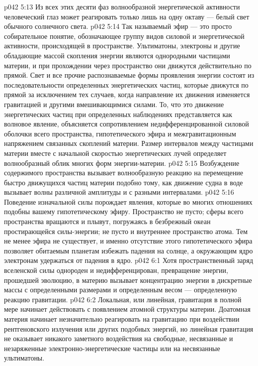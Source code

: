 \vs p042 5:13 \pc Из всех этих десяти фаз волнообразной энергетической активности человеческий глаз может реагировать только лишь на одну октаву --- белый свет обычного солнечного света.
\vs p042 5:14 \pc Так называемый эфир --- это просто собирательное понятие, обозначающее группу видов силовой и энергетической активности, происходящей в пространстве. Ультиматоны, электроны и другие обладающие массой скопления энергии являются однородными частицами материи, и при прохождении через пространство они движутся действительно по прямой. Свет и все прочие распознаваемые формы проявления энергии состоят из последовательности определенных энергетических частиц, которые движутся по прямой за исключением тех случаев, когда направление их движения изменяется гравитацией и другими вмешивающимися силами. То, что это движение энергетических частиц при определенных наблюдениях представляется как волновое явление, объясняется сопротивлением недифференцированной силовой оболочки всего пространства, гипотетического эфира и межгравитационным напряжением связанных скоплений материи. Размер интервалов между частицами материи вместе с начальной скоростью энергетических лучей определяет волнообразный облик многих форм энергии\hyp{}материи.
\vs p042 5:15 Возбуждение содержимого пространства вызывает волнообразную реакцию на перемещение быстро движущихся частиц материи подобно тому, как движение судна в воде вызывает волны различной амплитуды и с разными интервалами.
\vs p042 5:16 Поведение изначальной силы порождает явления, которые во многих отношениях подобны вашему гипотетическому эфиру. Пространство не пусто; сферы всего пространства вращаются и плывут, погружаясь в безбрежный океан простирающейся силы\hyp{}энергии; не пусто и внутреннее пространство атома. Тем не менее эфира не существует, и именно отсутствие этого гипотетического эфира позволяет обитаемым планетам избежать падения на солнце, а окружающим ядро электронам удержаться от падения в ядро.
\vs p042 6:1 Хотя пространственный заряд вселенской силы однороден и недифференцирован, превращение энергии, прошедшей эволюцию, в материю вызывает концентрацию энергии в дискретные массы с определенными размерами и определенным весом --- определенную реакцию гравитации.
\vs p042 6:2 Локальная, или линейная, гравитация в полной мере начинает действовать с появлением атомной структуры материи. Доатомная материя начинает незначительно реагировать на гравитацию при воздействии рентгеновского излучения или других подобных энергий, но линейная гравитация не оказывает никакого заметного воздействия на свободные, несвязанные и незаряженные электронно\hyp{}энергетические частицы или на несвязанные ультиматоны.
